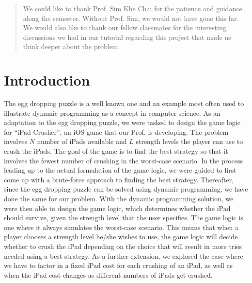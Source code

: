 \documentclass[12pt,a4paper,oneside]{report}
\begin{document}
\renewcommand{\abstractname}{Acknowledgements}
\begin{abstract}
\setcounter{page}{3}
\thispagestyle{plain}
\onehalfspacing
{}
We could like to thank Prof. Sim Khe Chai for the patience and guidance along the semester. Without Prof. Sim, we would not have gone this far. We would also like to thank our fellow classmates for the interesting discussions we had in our tutorial regarding this project that made us think deeper about the problem.
\end{abstract}

\onehalfspacing
\tableofcontents
\thispagestyle{empty}

\chapter{Introduction}
\setcounter{page}{1}
The egg dropping puzzle is a well known one and an example most often used to illustrate dynamic programming as a concept in computer science. As an adaptation to the egg dropping puzzle, we were tasked to design the game logic for ``iPad Crusher'', an iOS game that our Prof. is developing. The problem involves $N$ number of iPads available and $L$ strength levels the player can use to crush the iPads. The goal of the game is to find the best strategy so that it involves the fewest number of crushing in the worst-case scenario. In the process leading up to the actual formulation of the game logic, we were guided to first come up with a brute-force approach to finding the best strategy. Thereafter, since the egg dropping puzzle can be solved using dynamic programming, we have done the same for our problem. With the dynamic programming solution, we were then able to design the game logic, which determines whether the iPad should survive, given the strength level that the user specifies. The game logic is one where it always simulates the worst-case scenario. This means that when a player chooses a strength level he/she wishes to use, the game logic will decide whether to crush the iPad depending on the choice that will result in more tries needed using a best strategy. As a further extension, we explored the case where we have to factor in a fixed iPad cost for each crushing of an iPad, as well as when the iPad cost changes as different numbers of iPads get crushed.
\end{document}
